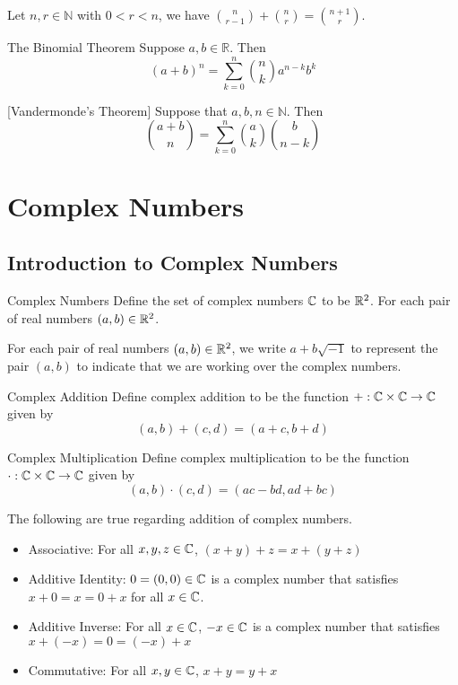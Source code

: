 \documentclass[a4paper]{article}
\begin{document}
\begin{prp}{}{} Let $n,r\in\mathbb{N}$ with $0<r<n$, we have $\binom{n}{r-1}+\binom{n}{r}=\binom{n+1}{r}$. 
\end{prp}

\begin{thm}{The Binomial Theorem}{} Suppose $a,b\in\mathbb{R}$. Then $$(a+b)^n=\sum_{k=0}^n\binom{n}{k}a^{n-k}b^k$$
\end{thm}

\begin{thm}{}{}[Vandermonde's Theorem] Suppose that $a,b,n\in\mathbb{N}$. Then $$\binom{a+b}{n}=\sum_{k=0}^{n}\binom{a}{k}\binom{b}{n-k}$$
\end{thm}

\pagebreak
\section{Complex Numbers}
\subsection{Introduction to Complex Numbers}
\begin{defn}{Complex Numbers}{} Define the set of complex numbers $\mathbb{C}$ to be $\mathbb{R}^2$. For each pair of real numbers $(a,b)\in\mathbb{R}^2$. 
\end{defn}

For each pair of real numbers $(a,b)\in\mathbb{R}^2$, we write $a+b\sqrt{-1}$ to represent the pair $(a,b)$ to indicate that we are working over the complex numbers. 

\begin{defn}{Complex Addition}{} Define complex addition to be the function $+:\mathbb{C}\times\mathbb{C}\to\mathbb{C}$ given by $$(a,b)+(c,d)=(a+c,b+d)$$
\end{defn}

\begin{defn}{Complex Multiplication}{} Define complex multiplication to be the function $\cdot:\mathbb{C}\times\mathbb{C}\to\mathbb{C}$ given by $$(a,b)\cdot(c,d)=(ac-bd,ad+bc)$$
\end{defn}

\begin{prp}{}{} The following are true regarding addition of complex numbers. 
\begin{itemize}
\item Associative: For all $x,y,z\in\mathbb{C}$, $(x+y)+z=x+(y+z)$
\item Additive Identity: $0=(0,0)\in\mathbb{C}$ is a complex number that satisfies $x+0=x=0+x$ for all $x\in\mathbb{C}$. 
\item Additive Inverse: For all $x\in\mathbb{C}$, $-x\in\mathbb{C}$ is a complex number that satisfies $x+(-x)=0=(-x)+x$
\item Commutative: For all $x,y\in\mathbb{C}$, $x+y=y+x$
\end{itemize}
\end{prp}
\end{document}
